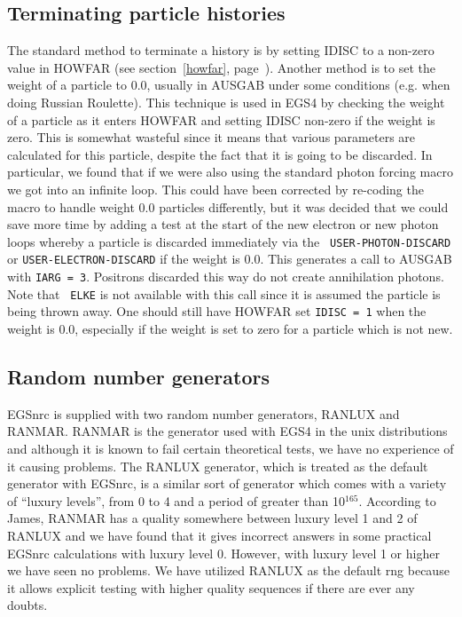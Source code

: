 \subsection{Terminating particle histories}
\label{termination}
The standard method to terminate a history is by setting
IDISC to a non-zero value in HOWFAR (see section~\ref{howfar},
page~\pageref{howfar}).  Another method is to set the weight of
a particle to 0.0, usually in AUSGAB under some conditions (e.g. when
doing Russian Roulette).  This technique is used in EGS4 by checking the
weight of a particle as it enters HOWFAR and setting IDISC non-zero if the
weight is zero.  This is somewhat wasteful since it means that various
parameters are calculated for this particle, despite the fact that it
is going to be discarded. In particular, we found that if we were also
using the standard photon forcing macro we got into an infinite loop.
This could have been corrected by re-coding the macro to handle weight
0.0 particles differently, but it was decided that we could save more
time by adding a test at the start of the new electron or new photon loops
whereby a particle is discarded immediately via the {\tt
USER-PHOTON-DISCARD} or {\tt USER-ELECTRON-DISCARD} if the weight is 0.0.
This generates a call to AUSGAB with {\tt IARG = 3}. Positrons discarded
this way do not create annihilation photons. Note that {\tt
ELKE} is not available with this call since it is assumed the particle
is being thrown away.  One should still have HOWFAR set {\tt IDISC = 1}
when the weight is 0.0, especially if the weight is set to zero for a
particle which is not new.


\subsection{Random number generators}
\label{rngs}

EGSnrc is supplied with two random number generators, RANLUX
and RANMAR.  RANMAR is the generator used with EGS4 in the unix
distributions\cite{MZ91,Ma90a} and although it is known to fail certain
theoretical tests, we have no experience of it causing problems.
The RANLUX generator\cite{La94,Ja94}, which is treated as the default
generator with EGSnrc, is a similar sort of generator which comes
with a variety of ``luxury levels'', from 0 to 4 and a period of
greater than 10$^{165}$.  According to James, RANMAR has a
quality somewhere between luxury level 1 and 2 of RANLUX
and we have found
that it gives incorrect answers in some practical EGSnrc calculations
with luxury level 0. However, with luxury level 1 or higher we have
seen no problems.  We have utilized RANLUX as the default rng because
it allows explicit testing with higher quality sequences if there are
ever any doubts.

